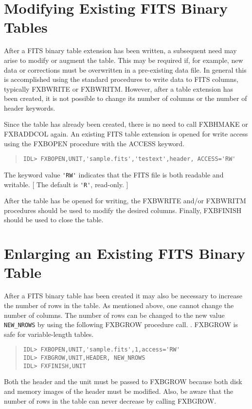 \section{Modifying Existing FITS Binary Tables}

After a FITS binary table extension has been written, a subsequent
need may arise to modify or augment the table.  This may be required
if, for example, new data or corrections must be overwritten in a
pre-existing data file.  In general this is accomplished using the
standard procedures to write data to FITS columns, typically FXBWRITE
or FXBWRITM.  However, after a table extension has been created, it is
not possible to change its number of columns or the number of header
keywords.

Since the table has already been created, there is no need to call
FXBHMAKE or FXBADDCOL again.  An existing FITS table extension is
opened for write access using the FXBOPEN procedure with the ACCESS
keyword.
%
\begin{quote}
\begin{verbatim}
IDL> FXBOPEN,UNIT,'sample.fits','testext',header, ACCESS='RW'
\end{verbatim}
\end{quote}
%
The keyword value \verb|'RW'| indicates that the FITS file is both
readable and writable.  [ The default is \verb|'R'|, read-only. ]

After the table has be opened for writing, the FXBWRITE and/or
FXBWRITM procedures should be used to modify the desired columns.
Finally, FXBFINISH should be used to close the table.

\section{Enlarging an Existing FITS Binary Table}

After a FITS binary table has been created it may also be necessary to
increase the number of rows in the table.  As mentioned above, one
cannot change the number of columns.  The number of rows can be
changed to the new value \verb|NEW_NROWS| by using the following
FXBGROW procedure call.  .  FXBGROW is safe for variable-length tables.
%
\begin{quote}
\begin{verbatim}
IDL> FXBOPEN,UNIT,'sample.fits',1,access='RW'
IDL> FXBGROW,UNIT,HEADER, NEW_NROWS
IDL> FXFINISH,UNIT
\end{verbatim}
\end{quote}
%
Both the header and the unit must be passed to FXBGROW because both
disk and memory images of the header must be modified.  Also, be aware
that the number of rows in the table can never decrease by calling
FXBGROW.



